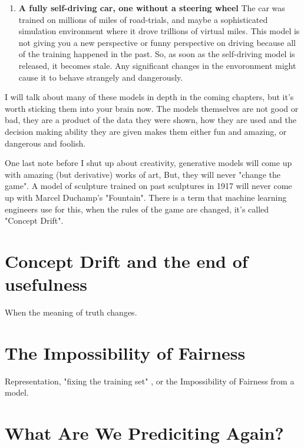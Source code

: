 \begin{enumerate}
    \item \textbf{A fully self-driving car, one without a steering wheel} The car was trained on millions of miles of road-trials, and maybe a sophisticated simulation environment where it drove trillions of virtual miles. This model is not giving you a new perspective or funny perspective on driving because all of the training happened in the past. So, as soon as the self-driving model is released, it becomes stale. Any significant changes in the envoronment might cause it to behave strangely and dangerously.
\end{enumerate}

I will talk about many of these models in depth in the coming chapters, but it's worth sticking them into your brain now. The models themselves are not good or bad, they are a product of the data they were shown, how they are used and the decision making ability they are given makes them either fun and amazing, or dangerous and foolish.

One last note before I shut up about creativity, generative models will come up with amazing (but derivative) works of art, But, they will never "change the game". A model of sculpture trained on past sculptures in 1917 will never come up with Marcel Duchamp's "Fountain". There is a term that machine learning engineers use for this, when the rules of the game are changed, it's called "Concept Drift".

\section{Concept Drift and the end of usefulness}

When the meaning of truth changes.

\section{The Impossibility of Fairness}

Representation, "fixing the training set" , or the Impossibility of Fairness from a model.

\section{What Are We Prediciting Again?}

